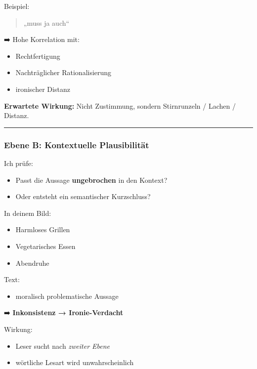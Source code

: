 \documentclass[
  letterpaper,
  DIV=11,
  numbers=noendperiod]{scrartcl}
\providecommand{\tightlist}{%
  \setlength{\itemsep}{0pt}\setlength{\parskip}{0pt}}
\begin{document}
Beispiel:

\begin{quote}
„muss ja auch``
\end{quote}

➡️ Hohe Korrelation mit:

\begin{itemize}
\tightlist
\item
  Rechtfertigung
\item
  Nachträglicher Rationalisierung
\item
  ironischer Distanz
\end{itemize}

\textbf{Erwartete Wirkung:} Nicht Zustimmung, sondern Stirnrunzeln /
Lachen / Distanz.

\begin{center}\rule{0.5\linewidth}{0.5pt}\end{center}

\subsubsection{Ebene B: Kontextuelle
Plausibilität}\label{ebene-b-kontextuelle-plausibilituxe4t}

Ich prüfe:

\begin{itemize}
\tightlist
\item
  Passt die Aussage \textbf{ungebrochen} in den Kontext?
\item
  Oder entsteht ein semantischer Kurzschluss?
\end{itemize}

In deinem Bild:

\begin{itemize}
\tightlist
\item
  Harmloses Grillen
\item
  Vegetarisches Essen
\item
  Abendruhe
\end{itemize}

Text:

\begin{itemize}
\tightlist
\item
  moralisch problematische Aussage
\end{itemize}

➡️ \textbf{Inkonsistenz → Ironie-Verdacht}

Wirkung:

\begin{itemize}
\tightlist
\item
  Leser sucht nach \emph{zweiter Ebene}
\item
  wörtliche Lesart wird unwahrscheinlich
\end{itemize}
\end{document}
